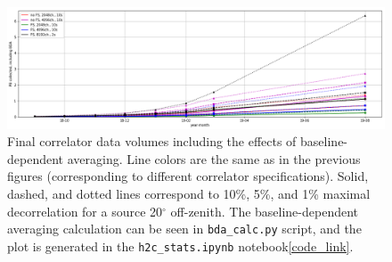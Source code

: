 \documentclass{article}
\begin{document}
\begin{figure}
  \includegraphics[width=\textwidth]{spec_calcs/corr_data_vols_bda.png}
  \caption{Final correlator data volumes including the effects of
    baseline-dependent averaging. Line colors are the same as in the previous
    figures (corresponding to different correlator specifications). Solid,
    dashed, and dotted lines correspond to 10\%, 5\%, and 1\% maximal
    decorrelation for a source 20$^\circ$ off-zenith. The baseline-dependent
    averaging calculation can be seen in \texttt{bda\_calc.py} script, and the
    plot is generated in the \texttt{h2c\_stats.ipynb}
    notebook\cref{code_link}.}
  \label{Fig:bda}
\end{figure}
\end{document}
